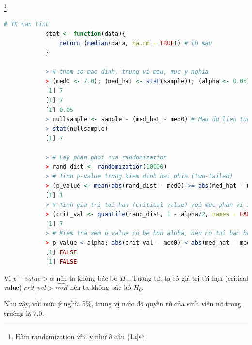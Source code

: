 \documentclass[a4paper,12pt]{article}
\begin{document}
\begin{enumerate}[label = \alph*)]
			\footnote{Hàm randomization vẫn y như ở câu~\ref{1a}}
			\begin{lstlisting}[language=R]
			# TK can tinh
			stat <- function(data){
				return (median(data, na.rm = TRUE)) # tb mau
			}
			
			> # tham so mac dinh, trung vi mau, muc y nghia
			> (med0 <- 7.0); (med_hat <- stat(sample)); (alpha <- 0.05)
			[1] 7
			[1] 7
			[1] 0.05
			> nullsample <- sample - (med_hat - med0) # Mau du lieu tuong ung voi H0
			> stat(nullsample)
			[1] 7
			 
			> # Lay phan phoi cua randomization
			> rand_dist <- randomization(10000)
			> # Tinh p-value trong kiem dinh hai phia (two-tailed)
			> (p_value <- mean(abs(rand_dist - med0) >= abs(med_hat - med0)))
			[1] 1
			> # Tinh gia tri toi han (critical value) voi muc phan vi 1-alpha/2
			> (crit_val <- quantile(rand_dist, 1 - alpha/2, names = FALSE))
			[1] 7
			> # Kiem tra xem p_value co be hon alpha, neu co thi bac bo H0
			> p_value < alpha; abs(crit_val - med0) < abs(med_hat - med0)
			[1] FALSE
			[1] FALSE
			\end{lstlisting}
			
			Vì $p-value > \alpha$ nên ta không bác bỏ $H_0$. Tương tự, ta có giá trị tới hạn (critical value) $crit\_val > \hat{med}$ nên ta không bác bỏ $H_0$. 
			
			Như vậy, với mức ý nghĩa 5\%, trung vị mức độ quyến rũ của sinh viên nữ trong trường là $7.0$. 
			
	\end{enumerate}
	
\end{document}
